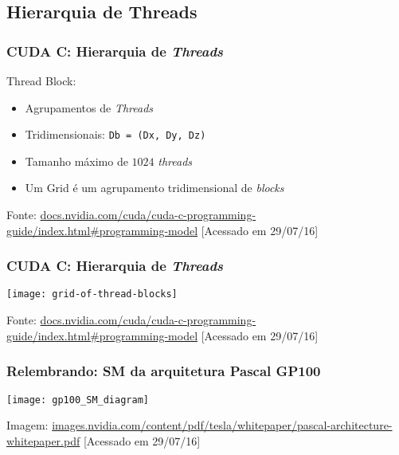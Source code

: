 \documentclass[10pt, compress]{beamer}
\begin{document}
\subsection{Hierarquia de Threads}

\begin{frame}
    \frametitle{CUDA C: Hierarquia de \textit{Threads}}
    \alert{Thread Block}:
    \begin{itemize}
        \item Agrupamentos de \textit{Threads}
        \item \alert{Tridimensionais}: \texttt{\footnotesize{Db = (Dx, Dy, Dz)}}
        \item Tamanho \alert{máximo} de $1024$ \textit{threads}
        \item Um \alert{Grid} é um agrupamento tridimensional de \textit{blocks}
    \end{itemize}

    \vfill

    \begin{center}
        \tiny{Fonte: \url{docs.nvidia.com/cuda/cuda-c-programming-guide/index.html\#programming-model} [Acessado em 29/07/16]}
    \end{center}
\end{frame}

\begin{frame}
    \frametitle{CUDA C: Hierarquia de \textit{Threads}}
    \centering
    \texttt{[image: grid-of-thread-blocks]}

    \tiny{Fonte: \url{docs.nvidia.com/cuda/cuda-c-programming-guide/index.html\#programming-model} [Acessado em 29/07/16]}
\end{frame}

\begin{frame}
    \frametitle{Relembrando: SM da arquitetura Pascal GP100}
    \centering
    \texttt{[image: gp100\_SM\_diagram]}

    \vfill

    \tiny{Imagem: \url{images.nvidia.com/content/pdf/tesla/whitepaper/pascal-architecture-whitepaper.pdf} [Acessado em 29/07/16]}
\end{frame}
\end{document}
